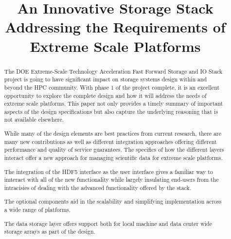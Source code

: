 \documentclass[conference]{IEEEtran}
\begin{document}

\title{An Innovative Storage Stack Addressing the Requirements of Extreme Scale Platforms}

\author{
\and
{}
\and
{}
\and
{}
\and
{}
\and
{}
}
\maketitle

\begin{abstract}
The DOE Extreme-Scale Technology Acceleration Fast Forward Storage and IO Stack
project is going to have significant impact on storage systems design within
and beyond the HPC community. With phase 1 of the project complete, it is an
excellent opportunity to explore the complete design and how it will address
the needs of extreme scale platforms.  This paper not only provides a timely
summary of important aspects of the design specifications but also capture the
underlying reasoning that is not available elsewhere.

While many of the design elements are best practices from current research,
there are many new contributions as well as different integration approaches
offering different performance and quality of service guarantees. The specifics
of how the different layers interact offer a new approach for managing
scientific data for extreme scale platforms.

The integration of the HDF5 interface as the user interface gives a familiar
way to imteract with all of the new functionality while largely insulating 
end-users from the intracisies of dealing with the advanced functionality
offered by the stack.

The optional components aid in the scalability and simplifying implementation
across a wide range of platforms.

The data storage layer offers support both for local machine and data center
wide storage arrays as part of the design.

\end{abstract}
\end{document}
